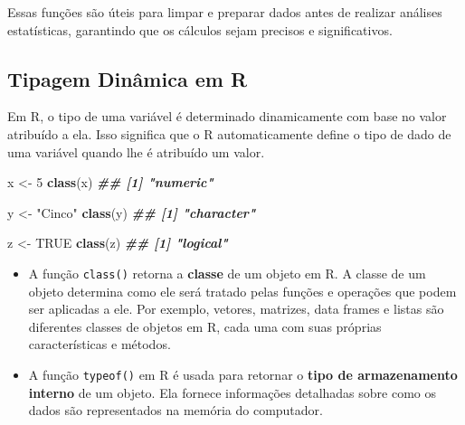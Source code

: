 \documentclass[
]{book}
\newenvironment{Shaded}{\begin{snugshade}}{\end{snugshade}}
\newcommand{\ConstantTok}[1]{\textcolor[rgb]{0.56,0.35,0.01}{#1}}
\newcommand{\DecValTok}[1]{\textcolor[rgb]{0.00,0.00,0.81}{#1}}
\newcommand{\DocumentationTok}[1]{\textcolor[rgb]{0.56,0.35,0.01}{\textbf{\textit{#1}}}}
\newcommand{\FunctionTok}[1]{\textcolor[rgb]{0.13,0.29,0.53}{\textbf{#1}}}
\newcommand{\NormalTok}[1]{#1}
\newcommand{\OtherTok}[1]{\textcolor[rgb]{0.56,0.35,0.01}{#1}}
\newcommand{\StringTok}[1]{\textcolor[rgb]{0.31,0.60,0.02}{#1}}
\begin{document}
Essas funções são úteis para limpar e preparar dados antes de realizar
análises estatísticas, garantindo que os cálculos sejam precisos e
significativos.

\subsection{Tipagem Dinâmica em R}\label{tipagem-dinuxe2mica-em-r}

Em R, o tipo de uma variável é determinado dinamicamente com base no
valor atribuído a ela. Isso significa que o R automaticamente define o
tipo de dado de uma variável quando lhe é atribuído um valor.

\begin{Shaded}
\begin{Highlighting}[]
\NormalTok{x }\OtherTok{\textless{}{-}} \DecValTok{5}         
\FunctionTok{class}\NormalTok{(x) }
\DocumentationTok{\#\# [1] "numeric"}

\NormalTok{y }\OtherTok{\textless{}{-}} \StringTok{"Cinco"}   
\FunctionTok{class}\NormalTok{(y) }
\DocumentationTok{\#\# [1] "character"}

\NormalTok{z }\OtherTok{\textless{}{-}} \ConstantTok{TRUE}  
\FunctionTok{class}\NormalTok{(z) }
\DocumentationTok{\#\# [1] "logical"}
\end{Highlighting}
\end{Shaded}

\begin{itemize}
\item
  A função \texttt{class()} retorna a \textbf{classe} de um objeto em R. A classe
  de um objeto determina como ele será tratado pelas funções e
  operações que podem ser aplicadas a ele. Por exemplo, vetores,
  matrizes, data frames e listas são diferentes classes de objetos em
  R, cada uma com suas próprias características e métodos.
\item
  A função \texttt{typeof()} em R é usada para retornar o \textbf{tipo de
  armazenamento interno} de um objeto. Ela fornece informações
  detalhadas sobre como os dados são representados na memória do
  computador.
\end{itemize}
\end{document}
